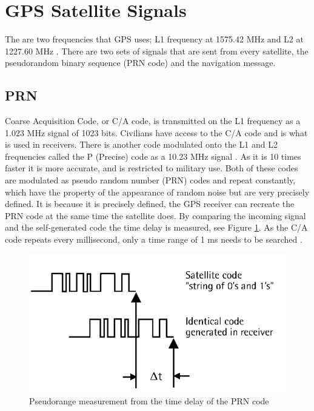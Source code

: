 
\section{GPS Satellite Signals}
The are two frequencies that GPS uses; L1 frequency at 1575.42 MHz and L2 at 1227.60 MHz \cite{signal spec}. There are two sets of signals that are sent from every satellite, the pseudorandom binary sequence (PRN code) and the navigation message.

\subsection{PRN}
Coarse Acquisition Code, or C/A code, is transmitted on the L1 frequency as a 1.023 MHz signal of 1023 bits. Civilians have access to the C/A code and is what is used in receivers. There is another code modulated onto the L1 and L2 frequencies called the P (Precise) code as a 10.23 MHz signal \cite{CA_oxts}. As it is 10 times faster it is more accurate, and is restricted to military use. Both of these codes are modulated as pseudo random number (PRN) codes and repeat constantly, which have the property of the appearance of random noise but are very precisely defined. It is because it is precisely defined, the GPS receiver can recreate the PRN code at the same time the satellite does. By comparing the incoming signal and the self-generated code the time delay is measured, see Figure \ref{fig:PRNtime}. As the C/A code repeats every millisecond, only a time range of 1 ms needs to be searched \cite{trimble_PRN}.


\cite{mit_signals}

\begin{figure}
\centering
\caption{Pseudorange measurement from the time delay of the PRN code \cite{whatwhenhow}}
\label{fig:PRNtime}
\includegraphics[width=0.7\linewidth]{ChapterLiteratureReview/PRNtime.png}
\end{figure}



